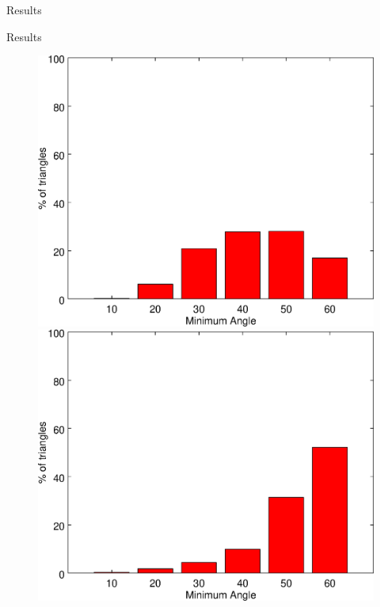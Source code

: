 \documentclass{beamer}
\begin{document}
\begin{frame}[plain]{Results}
\end{frame}

\begin{frame}[plain]{Results}
  
   \begin{figure}
    \begin{minipage}{.31\textwidth}
      \centering
      \includegraphics[width=1.0\linewidth]{../image/mp1.eps}
    \end{minipage} 
    \begin{minipage}{0.31\textwidth}
      \centering
      \includegraphics[width=1.0\linewidth]{../image/mp2.eps}

\end{minipage}
\end{figure}
\end{frame}
\end{document}
